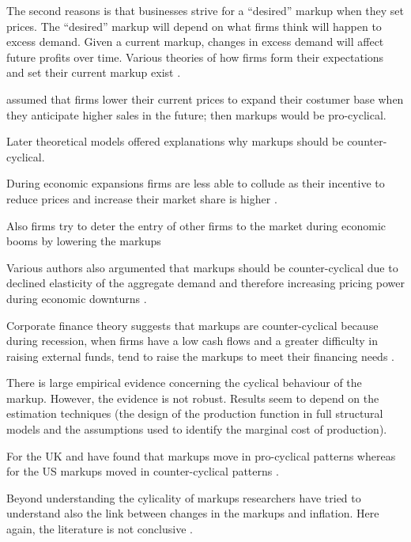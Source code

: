 \documentclass[twoside]{article}
\begin{document}
\begin{multicols}{2}
The second reasons is that businesses strive for a ``desired'' markup when they set prices. The ``desired'' markup will depend on what firms think will happen to excess demand. Given a current markup, changes in excess demand will affect future profits over time. Various theories of how firms form their expectations and set their current markup exist \citep{Macallan2008How}. 

\citet{Phelps1970Optimal} assumed that firms lower their current prices to expand their costumer base when they anticipate higher sales in the future; then markups would be pro-cyclical. 

Later theoretical models offered explanations why markups should be counter-cyclical. 

During economic expansions firms are less able to collude as their incentive to reduce prices and increase their market share is higher \citep{Rotemberg1986SupergameTheoretic}. 

Also firms try to deter the entry of other firms to the market during economic booms by lowering the markups \citep{Stiglitz1984Price}

Various authors also argumented that markups should be counter-cyclical due to declined elasticity of the aggregate demand and therefore increasing pricing power during economic downturns \citep{Bils1987Cyclical,Okun1981Prices,Klemperer1987Markets}. 


Corporate finance theory suggests that markups are counter-cyclical because during recession, when firms have a low cash flows and a greater difficulty in raising external funds, tend to raise the markups to meet their financing needs \citep{Klemperer1995Competition,Chevalier1996CapitalMarket}. 

There is large empirical evidence concerning the cyclical behaviour of the markup. However,  the evidence is not robust. Results seem to depend on the estimation techniques (the design of the production function in full structural models and the assumptions used to identify the marginal cost of production). 

For the UK \citet{Haskel1995Price} and \citet{Macallan2008How}  have found that markups move in pro-cyclical patterns whereas for the US  markups moved in counter-cyclical patterns \citep{Bils1987Cyclical,Martins1999Levels,Rotemberg1991Markups}. 

Beyond understanding the cylicality of markups researchers have tried to understand also the link between changes in the markups and inflation. Here again, the literature is not conclusive \citep{Klein2011South}. 


\end{multicols}
\end{document}
